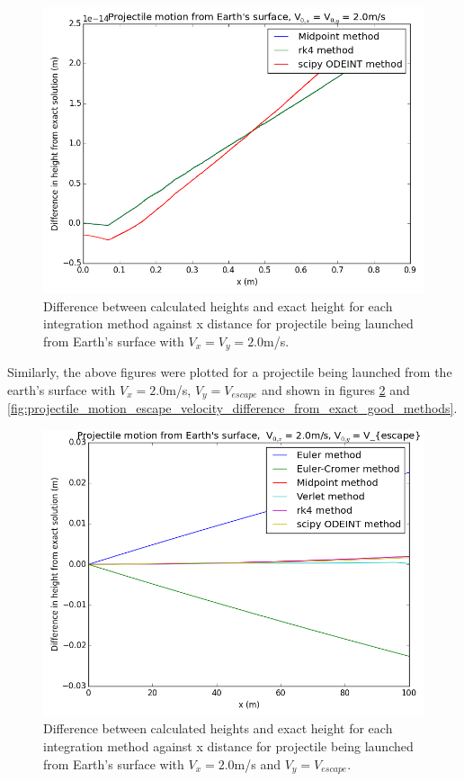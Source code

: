 \documentclass[10pt,letterpaper]{article}
\begin{document}
\begin{figure}[!htb]
\centering
\includegraphics[scale=0.6]{figures/test_cases/projectile_motion_difference_from_exact_good_methods_no_verlet.png}
\caption{Difference between calculated heights and exact height for each integration method against x distance for projectile being launched from Earth's surface with $V_x = V_y = 2.0$m/s.}\label{fig:projectile_motion_difference_from_exact_good_methods_no_verlet}
\end{figure}

Similarly, the above figures were plotted for a projectile being launched from the earth's surface with $V_x = 2.0$m/s, $V_y = V_{escape}$ and shown in figures \ref{fig:projectile_motion_escape_velocity_difference_from_exact_all_methods} and \ref{fig:projectile_motion_escape_velocity_difference_from_exact_good_methods}.\\

\begin{figure}[!htb]
\centering
\includegraphics[scale=0.6]{figures/test_cases/projectile_motion_escape_velocity_difference_from_exact_all_methods.png}
\caption{Difference between calculated heights and exact height for each integration method against x distance for projectile being launched from Earth's surface with $V_x = 2.0$m/s and $V_y = V_{escape}$.}\label{fig:projectile_motion_escape_velocity_difference_from_exact_all_methods}
\end{figure}
\end{document}
